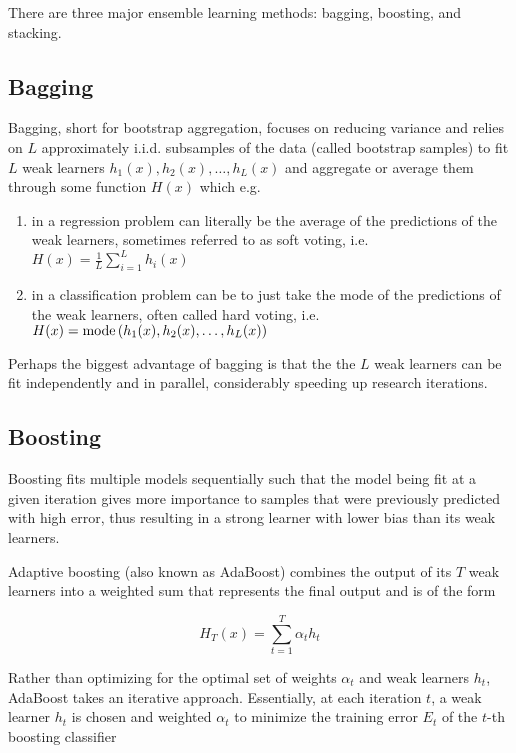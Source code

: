 There are three major ensemble learning methods: bagging, boosting, and stacking.

\subsection{Bagging}

Bagging, short for bootstrap aggregation, focuses on reducing variance and relies on $L$ approximately i.i.d. subsamples of the data (called bootstrap samples) to fit $L$ weak learners $h_1(x), h_2(x), \ldots, h_L(x)$ and aggregate or average them through some function $H(x)$ which e.g.

\begin{enumerate}
    \item in a regression problem can literally be the average of the predictions of the weak learners, sometimes referred to as soft voting, i.e. $H(x) = \frac{1}{L} \sum_{i=1}^{L} h_i(x)$
    \item in a classification problem can be to just take the mode of the predictions of the weak learners, often called hard voting, i.e. $H(x) = \operatorname*{mode}{(h_1(x), h_2(x), \ldots, h_L(x))}$
\end{enumerate}

Perhaps the biggest advantage of bagging is that the the $L$ weak learners can be fit independently and in parallel, considerably speeding up research iterations.

\subsection{Boosting}

Boosting fits multiple models sequentially such that the model being fit at a given iteration gives more importance to samples that were previously predicted with high error, thus resulting in a strong learner with lower bias than its weak learners.

Adaptive boosting (also known as AdaBoost) \cite{adaboost} combines the output of its $T$ weak learners into a weighted sum that represents the final output and is of the form

$$
H_T(x) = \sum_{t=1}^{T} \alpha_t h_t
$$

Rather than optimizing for the optimal set of weights $\alpha_t$ and weak learners $h_t$, AdaBoost takes an iterative approach. Essentially, at each iteration $t$, a weak learner $h_t$ is chosen and weighted $\alpha_t$ to minimize the training error $E_t$ of the $t$-th boosting classifier

